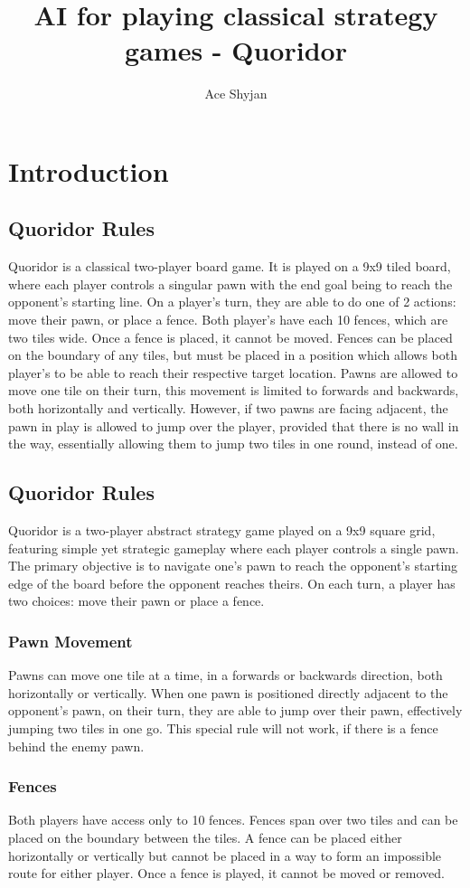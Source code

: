 \documentclass[review]{cmpreport}
\title{AI for playing classical strategy games - Quoridor}
\author{Ace Shyjan}
\begin{document}
\section{Introduction}

\subsection{Quoridor Rules}
Quoridor is a classical two-player board game. It is played on a 9x9 tiled board, where each player controls a singular pawn with the end goal being to reach the opponent's starting line. On a player's turn, they are able to do one of 2 actions: move their pawn, or place a fence. Both player's have each 10 fences, which are two tiles wide. Once a fence is placed, it cannot be moved. Fences can be placed on the boundary of any tiles, but must be placed in a position which allows both player's to be able to reach their respective target location. Pawns are allowed to move one tile on their turn, this movement is limited to forwards and backwards, both horizontally and vertically. However, if two pawns are facing adjacent, the pawn in play is allowed to jump over the player, provided that there is no wall in the way, essentially allowing them to jump two tiles in one round, instead of one. 

\subsection{Quoridor Rules}
Quoridor is a two-player abstract strategy game played on a 9x9 square grid, featuring simple yet strategic gameplay where each player controls a single pawn. The primary objective is to navigate one's pawn to reach the opponent’s starting edge of the board before the opponent reaches theirs. On each turn, a player has two choices: move their pawn or place a fence. 

\subsubsection{Pawn Movement}
Pawns can move one tile at a time, in a forwards or backwards direction, both horizontally or vertically. When one pawn is positioned directly adjacent to the opponent's pawn, on their turn, they are able to jump over their pawn, effectively jumping two tiles in one go. This special rule will not work, if there is a fence behind the enemy pawn.

\subsubsection{Fences}
Both players have access only to 10 fences. Fences span over two tiles and can be placed on the boundary between the tiles. A fence can be placed either horizontally or vertically but cannot be placed in a way to form an impossible route for either player. Once a fence is played, it cannot be moved or removed.
\end{document}
